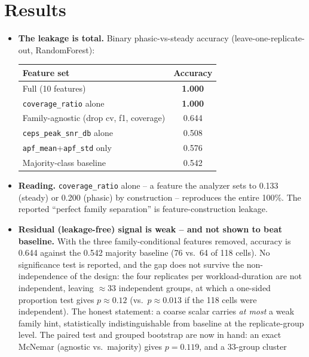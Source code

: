 \documentclass[conference]{IEEEtran}
\begin{document}
\section{Results}
\begin{itemize}
  \item \textbf{The leakage is total.} Binary phasic-vs-steady accuracy
        (leave-one-replicate-out, RandomForest):
        \begin{center}
        \begin{tabular}{lc}
          \toprule
          Feature set & Accuracy \\
          \midrule
          Full (10 features)              & \textbf{1.000} \\
          \texttt{coverage\_ratio} alone  & \textbf{1.000} \\
          Family-agnostic (drop cv, f1, coverage) & 0.644 \\
          \texttt{ceps\_peak\_snr\_db} alone & 0.508 \\
          \texttt{apf\_mean}+\texttt{apf\_std} only & 0.576 \\
          Majority-class baseline         & 0.542 \\
          \bottomrule
        \end{tabular}
        \end{center}
  \item \textbf{Reading.} \texttt{coverage\_ratio} alone -- a feature the
        analyzer sets to 0.133 (steady) or 0.200 (phasic) by construction --
        reproduces the entire 100\%. The reported ``perfect family separation''
        is feature-construction leakage.
  \item \textbf{Residual (leakage-free) signal is weak -- and not shown to beat
        baseline.} With the three family-conditional features removed, accuracy
        is 0.644 against the 0.542 majority baseline (76 vs.\ 64 of 118 cells).
        No significance test is reported, and the gap does not survive the
        non-independence of the design: the four replicates per
        workload-duration are not independent, leaving $\approx 33$ independent
        groups, at which a one-sided proportion test gives $p \approx 0.12$
        (vs.\ $p \approx 0.013$ if the 118 cells were independent). The honest
        statement: a coarse scalar carries \emph{at most} a weak family hint,
        statistically indistinguishable from baseline at the replicate-group
        level. The paired test and grouped bootstrap are now in hand: an exact
        McNemar (agnostic vs.\ majority) gives $p=0.119$, and a 33-group cluster

\end{itemize}
\end{document}
